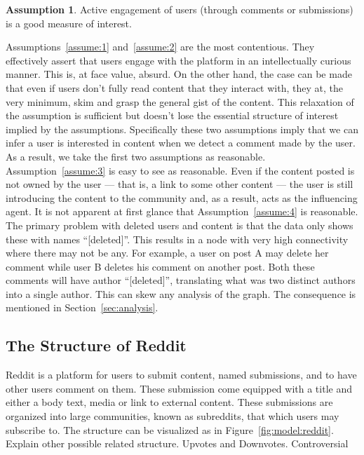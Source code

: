 \documentclass[letterpaper, 10 pt, conference]{ieeeconf}
\theoremstyle{definition}
\newtheorem{assumption}{Assumption}[section]
\newcommand{\red}{\color{red}}
\begin{document}
\begin{assumption}
  Active engagement of users (through comments or submissions) is a good measure of interest.
  \label{assume:5}
\end{assumption}

Assumptions~\ref{assume:1} and~\ref{assume:2} are the most contentious. They effectively assert that users engage with the platform in an intellectually curious manner. This is, at face value, absurd. On the other hand, the case can be made that even if users don't fully read content that they interact with, they at, the very minimum, skim and grasp the general gist of the content. This relaxation of the assumption is sufficient but doesn't lose the essential structure of interest implied by the assumptions. Specifically these two assumptions imply that we can infer a user is interested in content when we detect a comment made by the user. As a result, we take the first two assumptions as reasonable. Assumption~\ref{assume:3} is easy to see as reasonable. Even if the content posted is not owned by the user --- that is, a link to some other content --- the user is still introducing the content to the community and, as a result, acts as the influencing agent. It is not apparent at first glance that Assumption~\ref{assume:4} is reasonable. The primary problem with deleted users and content is that the data only shows these with names ``[deleted]''. This results in a node with very high connectivity where there may not be any. For example, a user on post A may delete her comment while user B deletes his comment on another post. Both these comments will have author ``[deleted]'', translating what was two distinct authors into a single author. This can skew any analysis of the graph. The consequence is mentioned in Section~\ref{sec:analysis}. 

\subsection{The Structure of Reddit}
Reddit is a platform for users to submit content, named submissions, and to have other users comment on them. These submission come equipped with a title and either a body text, media or link to external content. These submissions are organized into large communities, known as subreddits, that which users may subscribe to. The structure can be visualized as in Figure~\ref{fig:model:reddit}.
{\red Explain other possible related structure. Upvotes and Downvotes. Controversial}
\end{document}
